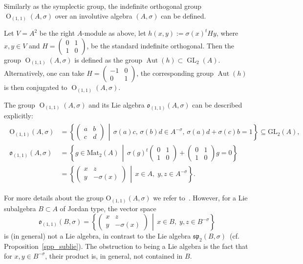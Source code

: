 \documentclass[a4paper,oneside,11pt]{amsart}
\DeclareMathOperator{\Aut}{Aut}
\DeclareMathOperator{\GL}{GL}
\DeclareMathOperator{\OO}{O}
\newcommand{\midwd}{\,\middle\vert\,}
\theoremstyle{plain}
\theoremstyle{definition}
\theoremstyle{remark}
\begin{document}
Similarly as the symplectic group, the indefinite orthogonal group $\OO_{(1,1)}(A,\sigma)$ over an involutive algebra $(A,\sigma)$ can be defined.

Let $V=A^2$ be the right $A$-module as above, let $h(x,y):=\sigma(x)^tH y$, where $x,y\in V$ and $H=\begin{pmatrix}
 0 & 1 \\
 1 & 0
\end{pmatrix}$, be the standard indefinite orthogonal. Then the group $\OO_{(1,1)}(A,\sigma)$ is defined as the group $\Aut(h)\subset\GL_2(A)$. Alternatively, one can take $H=\begin{pmatrix}
 -1 & 0 \\
 0 & 1
\end{pmatrix}$, the corresponding group $\Aut(h)$ is then conjugated to $\OO_{(1,1)}(A,\sigma)$.

The group $\OO_{(1,1)}(A,\sigma)$ and its Lie algebra $\mathfrak{o}_{(1,1)}(A,\sigma)$ can be described explicitly: 
\begin{align}
\begin{aligned}
    \mathrm{O}_{(1,1)}(A,\sigma)&=\left\{\begin{pmatrix}
    a & b \\
    c & d
    \end{pmatrix}\midwd \sigma(a)c,\,\sigma(b)d\in A^{-\sigma},\,\sigma(a)d+\sigma(c)b=1\right\}\subseteq \mathrm{GL}_2(A),\\
    \mathfrak o_{(1,1)}(A,\sigma)& =\left\{g\in \mathrm{Mat}_2(A)\midwd \sigma(g)^t\begin{pmatrix}
        0 & 1 \\
        1 & 0
      \end{pmatrix}+ \begin{pmatrix}
        0 & 1 \\
        1 & 0
      \end{pmatrix} g=0\right\}\\
      & =\left\{\begin{pmatrix}
		x & z \\
		y & -\sigma(x)
	\end{pmatrix}\midwd x\in A,\;y,z\in A^{-\sigma}\right\}.
\end{aligned}
\end{align}

For more details about the group $\mathrm{O}_{(1,1)}(A,\sigma)$ we refer to~\cite[Part 1]{HKRW}. However, for a Lie subalgebra $B\subset A$ of Jordan type, the vector space 
$$\mathfrak o_{(1,1)}(B,\sigma)=\left\{\begin{pmatrix}
		x & z \\
		y & -\sigma(x)
	\end{pmatrix}\midwd x\in B,\;y,z\in B^{-\sigma}\right\}$$
is (in general) not a Lie algebra, in contrast to the Lie algebra $\mathfrak {sp}_{2}(B,\sigma)$~(cf. Proposition~\ref{spp_sublie}). The obstruction to being a Lie algebra is the fact that for $x,y\in B^{-\sigma}$, their product  is, in general, not contained in $B$.
\end{document}
